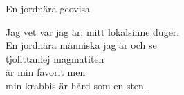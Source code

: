 \begin{song}{En jordnära geovisa}

	
	
	Jag vet var jag är; mitt lokalsinne duger.\\
	En jordnära människa jag är och se\\
	tjolittanlej magmatiten\\
	är min favorit men\\
	min krabbis är hård som en sten.
	
\end{song}
